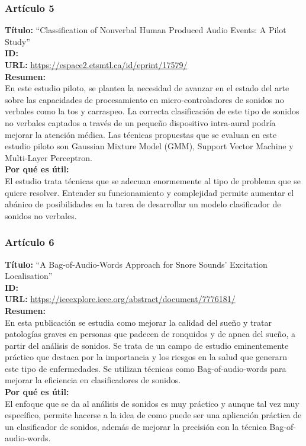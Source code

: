 \subsubsection*{Artículo 5}
\begin{flushleft}
    \textbf{Título:}
    “Classification of Nonverbal Human Produced Audio Events: A Pilot Study”
    \\
    \textbf{ID: \cite{bouserhal2018classification}}
    \\
    \textbf{URL:}
    \url{https://espace2.etsmtl.ca/id/eprint/17579/}
    \\
    \textbf{Resumen:\\}
    En este estudio piloto, se plantea la necesidad de avanzar en el estado del arte sobre las capacidades de procesamiento en micro-controladores de sonidos no verbales como la tos y carraspeo. La correcta clasificación de este tipo de sonidos no verbales captados a través de un pequeño dispositivo intra-aural podría mejorar la atención médica. Las técnicas propuestas que se evaluan en este estudio piloto son Gaussian Mixture Model (GMM), Support Vector Machine y Multi-Layer Perceptron.
    \\
    \textbf{Por qué es útil:\\}
    El estudio trata técnicas que se adecuan enormemente al tipo de problema que se quiere resolver. Entender su funcionamiento y complejidad permite aumentar el abánico de posibilidades en la tarea de desarrollar un modelo clasificador de sonidos no verbales.
\end{flushleft}
\subsubsection*{Artículo 6}
\begin{flushleft}
    \textbf{Título:}
    “A Bag-of-Audio-Words Approach for Snore Sounds' Excitation Localisation”
    \\
    \textbf{ID: \cite{schmitt2016bag}}
    \\
    \textbf{URL:}
    \url{https://ieeexplore.ieee.org/abstract/document/7776181/}
    \\
    \textbf{Resumen:\\}
    En esta publicación se estudia como mejorar la calidad del sueño y tratar patologías graves en personas que padecen de ronquidos y de apnea del sueño, a partir del análisis de sonidos. Se trata de un campo de estudio eminentemente práctico que destaca por la importancia y los riesgos en la salud que generarn este tipo de enfermedades. Se utilizan técnicas como Bag-of-audio-words para mejorar la eficiencia en clasificadores de sonidos.
    \\
    \textbf{Por qué es útil:\\}
    El enfoque que se da al análisis de sonidos es muy práctico y aunque tal vez muy específico, permite hacerse a la idea de como puede ser una aplicación práctica de un clasificador de sonidos, además de mejorar la precisión con la técnica Bag-of-audio-words.
\end{flushleft}
